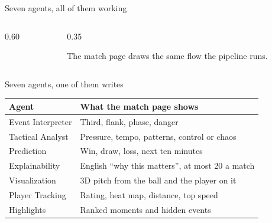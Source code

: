 \documentclass[aspectratio=169,11pt,t]{beamer}
\begin{document}
\begin{frame}{Seven agents, all of them working}
  \begin{columns}[T,onlytextwidth]
    \begin{column}{0.60\textwidth}
    \end{column}
    \begin{column}{0.35\textwidth}
      {\small The match page draws the same flow the pipeline runs.\par}
      \vspace{2mm}
    \end{column}
  \end{columns}
\end{frame}

\begin{frame}{Seven agents, one of them writes}
  \small
  \begin{tabular}{@{}lp{78mm}@{}}
    \toprule
    Agent & What the match page shows \\
    \midrule
    Event Interpreter & Third, flank, phase, danger \\
    Tactical Analyst & Pressure, tempo, patterns, control or chaos \\
    Prediction & Win, draw, loss, next ten minutes \\
    Explainability & English ``why this matters'', at most 20 a match \\
    Visualization & 3D pitch from the ball and the player on it \\
    Player Tracking & Rating, heat map, distance, top speed \\
    Highlights & Ranked moments and hidden events \\
    \bottomrule
  \end{tabular}
\end{frame}
\end{document}
